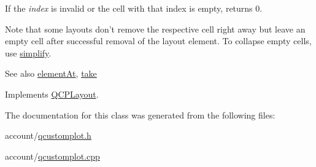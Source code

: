 \-If the {\itshape index\/} is invalid or the cell with that index is empty, returns 0.

\-Note that some layouts don't remove the respective cell right away but leave an empty cell after successful removal of the layout element. \-To collapse empty cells, use \hyperlink{classQCPLayoutInset_abb9eb23bf2d7c587a8abe02d065eae0a}{simplify}.

\begin{DoxySeeAlso}{\-See also}
\hyperlink{classQCPLayoutInset_ab096d07b08f9b5455647f3ba7ff60e27}{element\-At}, \hyperlink{classQCPLayoutInset_a9ac707ccff650633b97f52dd5cddcf49}{take} 
\end{DoxySeeAlso}


\-Implements \hyperlink{classQCPLayout_a5a79621fa0a6eabb8b520cfc04fb601a}{\-Q\-C\-P\-Layout}.



\-The documentation for this class was generated from the following files\-:\begin{DoxyCompactItemize}
\item 
account/\hyperlink{qcustomplot_8h}{qcustomplot.\-h}\item 
account/\hyperlink{qcustomplot_8cpp}{qcustomplot.\-cpp}\end{DoxyCompactItemize}
